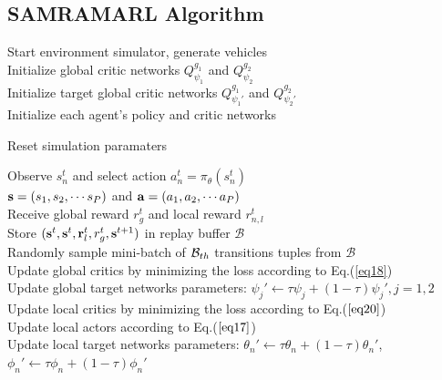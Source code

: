 \documentclass[10pt, lettersize,journal]{IEEEtran}
\begin{document}
	\subsection{SAMRAMARL Algorithm}
	\begin{algorithm}
		\caption{SAMRAMARL Algorithm}\label{al2}
		Start environment simulator, generate vehicles\\
		Initialize global critic networks $Q_{{\psi _1}}^{{g_1}}$ and $Q_{{\psi _2}}^{{g_2}}$\\
		Initialize target global critic networks $Q_{{\psi _1'}}^{{g_1}}$ and $Q_{{\psi _2'}}^{{g_2}}$\\
		Initialize each agent's policy and critic networks\\
		{
			Reset simulation paramaters\\
			{
				
				{
					Observe $s_n^t$ and select action $a_n^t=\pi_\theta(s_n^t)$\\
				}
				${\bf{s}} = ({s_1},{s_2}, \cdots {s_P})$ and ${\bf{a}} = ({a_1},{a_2}, \cdots {a_P})$ \\
				Receive global reward $r_g^t$ and local reward $r_{n,l}^t$\\
				Store $({{\bf{s}}^t},{{\bf{s}}^t},{\bf{r}}_l^t,r_g^t,{{\bf{s}}^{t + 1}})$ in replay buffer $\mathcal{B}$\\
				
				{
					Randomly sample mini-batch of ${{\cal B}_{th}}$ transitions tuples from $\mathcal{B}$\\
					Update global critics by minimizing the loss according to Eq.(\ref{eq18})\\
					Update global target networks parameters: ${\psi _j'} \leftarrow \tau {\psi _j} + (1 - \tau ){\psi _j'}, j=1,2$\\
					
					{
						{
							Update local critics by minimizing the loss according to Eq.($\ref{eq20}$)\\
							Update local actors according to Eq.($\ref{eq17}$)\\
							Update local target networks parameters: ${\theta _n'} \leftarrow \tau {\theta _n} + (1 - \tau ){\theta _n'}$, ${\phi _n'} \leftarrow \tau {\phi _n} + (1 - \tau ){\phi _n'}$
						}
					}
				}
			}
		}	
	\end{algorithm}
	
\end{document}
